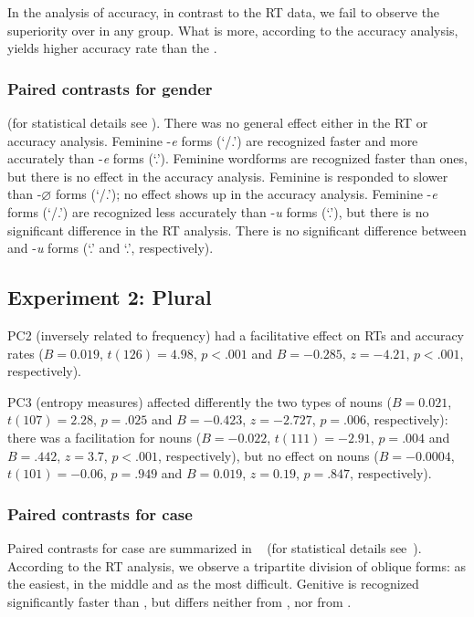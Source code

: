 \documentclass[output=paper, modfonts,newtxmath,hidelinks]{langscibook}
\begin{document}
In the analysis of accuracy, in contrast to the RT data, we fail to observe the  superiority over  in any  group. What is more, according to the accuracy analysis,   yields higher accuracy rate than the  . 

\subsubsection{Paired contrasts for gender} (for statistical details see ). There was no general  effect either in the RT or accuracy analysis. Feminine -\textit{e} forms (`\datt/\locc.\fem') are recognized faster and more accurately than  -\textit{e} forms (`\locc.\masc'). Feminine  wordforms are recognized faster than  ones, but there is no effect in the accuracy analysis. Feminine  is responded to slower than  -$\varnothing$ forms (`\nomm/\accc.\masc'); no effect shows up in the accuracy analysis. Feminine -\textit{e} forms (`\datt/\locc.\fem') are recognized less accurately than  -\textit{u}  forms (`\datt.\masc'), but there is no significant difference in the RT analysis. There is no significant difference between  and  -\textit{u} forms (`\accc.\fem' and `\datt.\masc', respectively).

\subsection{Experiment 2: Plural}

PC2 (inversely related to frequency) had a facilitative effect on RTs and accuracy rates ($B= 0.019$, $t(126)= 4.98$, $p< .001$ and $B = -0.285$, $z= -4.21$, $p< .001$, respectively). 

PC3 (entropy measures) affected differently the two types of nouns ($B= 0.021$, $t(107)= 2.28$, $p= .025$ and $B = -0.423$, $z= -2.727$, $p= .006$, respectively): there was a facilitation for  nouns ($B= -0.022$, $t(111)= -2.91$, $p= .004$ and $B= .442$, $z= 3.7$, $p< .001$, respectively), but no effect on  nouns ($B= -0.0004$, $t(101)= -0.06$, $p= .949$ and $B= 0.019$, $z= 0.19$, $p= .847$, respectively).

\subsubsection{Paired contrasts for case} 
Paired contrasts for case
are summarized in ~ (for statistical details see~). According to the RT analysis, we observe a tripartite division of oblique forms:  as the easiest,  in the middle and  as the most difficult. Genitive is recognized significantly faster than , but differs neither from , nor from . 
\end{document}
